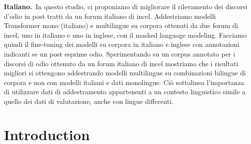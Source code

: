 \documentclass[11pt]{article}
\newcommand{\todoA}[1]{\todo[color=blue!40]{A: #1}}
\begin{document}
\begin{abstract-alt}
\textrm{\bf{Italiano.}}~In questo studio, ci proponiamo di migliorare il rilevamento dei discorsi d'odio in post tratti da un forum italiano di incel.
Addestriamo modelli Transformer mono (italiano) e multilingue su corpora ottenuti da due forum di incel, uno in italiano e uno in inglese, con il masked language modeling. Facciamo quindi il fine-tuning dei modelli su corpora in italiano e inglese con annotazioni indicanti se un post esprime odio.
Sperimentando su un corpus annotato per i discorsi di odio ottenuto da un forum italiano di incel mostriamo che i risultati migliori si ottengono addestrando modelli multilingue su combinazioni bilingue di corpora e non con modelli italiani e dati monolingue. Ciò sottolinea l'importanza di utilizzare dati di addestramento appartenenti a un contesto linguistico simile a quello dei dati di valutazione, anche con lingue differenti.

\end{abstract-alt}


\section{Introduction}
\end{document}
